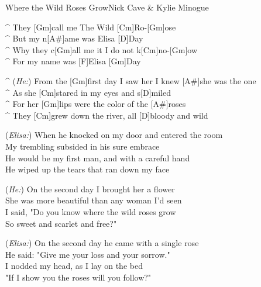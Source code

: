 \begin{song}{Where the Wild Roses Grow}{Nick Cave \& Kylie Minogue}

\begin{guitar}
^ They [Gm]call me The Wild [Cm]Ro-[Gm]ose\\
^ But my n[A#]ame was Elisa [D]Day\\
^ Why they c[Gm]all me it I do not k[Cm]no-[Gm]ow\\
^ For my name was [F]Elisa [Gm]Day \\
\end{guitar}


\begin{guitar}
^ (\emph{He:}) From the [Gm]first day I saw her I knew [A#]she was the one\\
^ As she [Cm]stared in my eyes and s[D]miled\\
^ For her [Gm]lips were the color of the [A#]roses\\
^ They [Cm]grew down the river, all [D]bloody and wild \\
\end{guitar}

\begin{guitar}
(\emph{Elisa:}) When he knocked on my door and entered the room\\
My trembling subsided in his sure embrace\\
He would be my first man, and with a careful hand\\
He wiped up the tears that ran down my face \\
\end{guitar}


\begin{guitar}
(\emph{He:}) On the second day I brought her a flower\\
She was more beautiful than any woman I'd seen\\
I said, "Do you know where the wild roses grow\\
So sweet and scarlet and free?" \\
\end{guitar}

\begin{guitar}
(\emph{Elisa:}) On the second day he came with a single rose\\
He said: "Give me your loss and your sorrow."\\
I nodded my head, as I lay on the bed\\
"If I show you the roses will you follow?" \\
\end{guitar}


\end{song}
